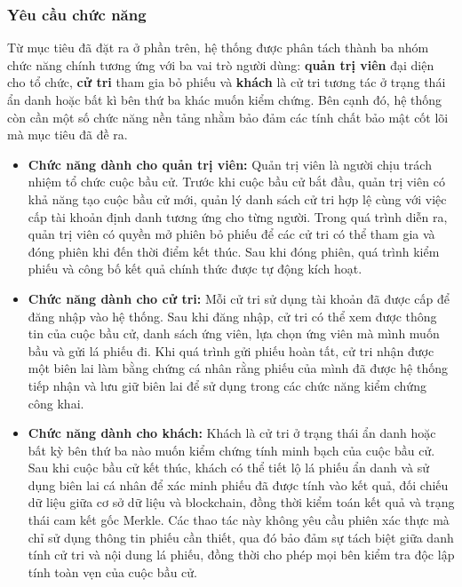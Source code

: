 \subsubsection{Yêu cầu chức năng}

Từ mục tiêu đã đặt ra ở phần trên, hệ thống được phân tách thành ba nhóm chức năng chính tương ứng với ba vai trò người dùng: \textbf{quản trị viên} đại diện cho tổ chức, \textbf{cử tri} tham gia bỏ phiếu và \textbf{khách} là cử tri tương tác ở trạng thái ẩn danh hoặc bất kì bên thứ ba khác muốn kiểm chứng. Bên cạnh đó, hệ thống còn cần một số chức năng nền tảng nhằm bảo đảm các tính chất bảo mật cốt lõi mà mục tiêu đã đề ra.

\begin{itemize}
    \item \textbf{Chức năng dành cho quản trị viên:} Quản trị viên là người chịu trách nhiệm tổ chức cuộc bầu cử. Trước khi cuộc bầu cử bắt đầu, quản trị viên có khả năng tạo cuộc bầu cử mới, quản lý danh sách cử tri hợp lệ cùng với việc cấp tài khoản định danh tương ứng cho từng người. Trong quá trình diễn ra, quản trị viên có quyền mở phiên bỏ phiếu để các cử tri có thể tham gia và đóng phiên khi đến thời điểm kết thúc. Sau khi đóng phiên, quá trình kiểm phiếu và công bố kết quả chính thức được tự động kích hoạt.

    \item \textbf{Chức năng dành cho cử tri:} Mỗi cử tri sử dụng tài khoản đã được cấp để đăng nhập vào hệ thống. Sau khi đăng nhập, cử tri có thể xem được thông tin của cuộc bầu cử, danh sách ứng viên, lựa chọn ứng viên mà mình muốn bầu và gửi lá phiếu đi. Khi quá trình gửi phiếu hoàn tất, cử tri nhận được một biên lai làm bằng chứng cá nhân rằng phiếu của mình đã được hệ thống tiếp nhận và lưu giữ biên lai để sử dụng trong các chức năng kiểm chứng công khai.

    \item \textbf{Chức năng dành cho khách:} Khách là cử tri ở trạng thái ẩn danh hoặc bất kỳ bên thứ ba nào muốn kiểm chứng tính minh bạch của cuộc bầu cử. Sau khi cuộc bầu cử kết thúc, khách có thể tiết lộ lá phiếu ẩn danh và sử dụng biên lai cá nhân để xác minh phiếu đã được tính vào kết quả, đối chiếu dữ liệu giữa cơ sở dữ liệu và blockchain, đồng thời kiểm toán kết quả và trạng thái cam kết gốc Merkle. Các thao tác này không yêu cầu phiên xác thực mà chỉ sử dụng thông tin phiếu cần thiết, qua đó bảo đảm sự tách biệt giữa danh tính cử tri và nội dung lá phiếu, đồng thời cho phép mọi bên kiểm tra độc lập tính toàn vẹn của cuộc bầu cử.
    

\end{itemize}
